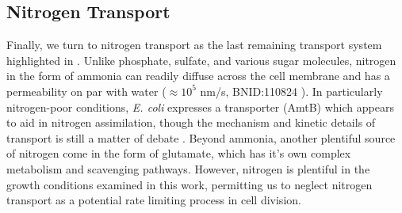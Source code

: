 \subsection{Nitrogen Transport}
Finally, we turn to nitrogen transport as the last remaining transport system
highlighted in . Unlike phosphate, sulfate, and various sugar
molecules, nitrogen in the form of ammonia can readily diffuse across the
cell membrane and has a permeability on par with water ($\approx 10^5$ nm/s,
BNID:110824 \cite{milo2010}). In particularly nitrogen-poor
conditions, \textit{E. coli} expresses a transporter (AmtB) which appears to aid in
nitrogen assimilation, though the mechanism and kinetic details of transport
is still a matter of debate \citep{heeswijk2013a, khademi2004}. Beyond ammonia,
another plentiful source of nitrogen come in the form of glutamate, which has it's
own complex metabolism and scavenging pathways. However, nitrogen is plentiful
in the growth conditions examined in this work, permitting us to neglect
nitrogen transport as a potential rate limiting process in cell division.

